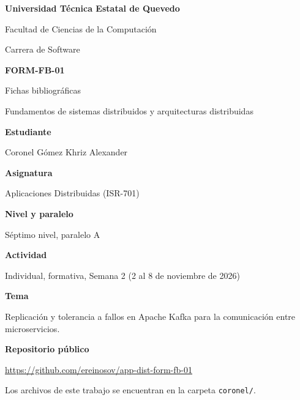 \documentclass[11pt,a4paper]{article}
\begin{document}
\begin{center}
{\large\bfseries Universidad Técnica Estatal de Quevedo}\par
Facultad de Ciencias de la Computación\par
Carrera de Software
\vspace{15mm}

{\Large\bfseries FORM-FB-01}\par
{\large Fichas bibliográficas}\par
Fundamentos de sistemas distribuidos y arquitecturas distribuidas
\end{center}
\vspace{12mm}

\textbf{Estudiante}\par
Coronel Gómez Khriz Alexander

\textbf{Asignatura}\par
Aplicaciones Distribuidas (ISR-701)

\textbf{Nivel y paralelo}\par
Séptimo nivel, paralelo A

\textbf{Actividad}\par
Individual, formativa, Semana 2 (2 al 8 de noviembre de 2026)

\textbf{Tema}\par
Replicación y tolerancia a fallos en Apache Kafka para la comunicación entre microservicios.

\textbf{Repositorio público}\par
\mbox{\url{https://github.com/ereinosov/app-dist-form-fb-01}}

Los archivos de este trabajo se encuentran en la carpeta \texttt{coronel/}.
\end{document}
